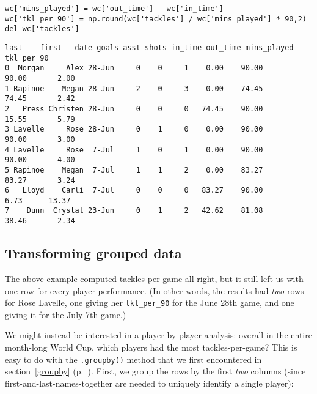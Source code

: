 \begin{Verbatim}[fontsize=\small,samepage=true,frame=single,framesep=3mm]
wc['mins_played'] = wc['out_time'] - wc['in_time']
wc['tkl_per_90'] = np.round(wc['tackles'] / wc['mins_played'] * 90,2)
del wc['tackles']
\end{Verbatim}
\vspace{-.2in}

\begin{Verbatim}[fontsize=\footnotesize,samepage=true,frame=leftline,framesep=5mm,framerule=1mm]
     last    first   date goals asst shots in_time out_time mins_played tkl_per_90
0  Morgan     Alex 28-Jun     0    0     1    0.00    90.00       90.00       2.00
1 Rapinoe    Megan 28-Jun     2    0     3    0.00    74.45       74.45       2.42
2   Press Christen 28-Jun     0    0     0   74.45    90.00       15.55       5.79
3 Lavelle     Rose 28-Jun     0    1     0    0.00    90.00       90.00       3.00
4 Lavelle     Rose  7-Jul     1    0     1    0.00    90.00       90.00       4.00
5 Rapinoe    Megan  7-Jul     1    1     2    0.00    83.27       83.27       3.24
6   Lloyd    Carli  7-Jul     0    0     0   83.27    90.00        6.73      13.37
7    Dunn  Crystal 23-Jun     0    1     2   42.62    81.08       38.46       2.34
\end{Verbatim}

\subsection{Transforming grouped data}

The above example computed tackles-per-game all right, but it still left us
with one row for every player-performance. (In other words, the results had
\textit{two} rows for Rose Lavelle, one giving her \texttt{tkl\_per\_90} for
the June 28th game, and one giving it for the July 7th game.)


We might instead be interested in a player-by-player analysis: overall in the
entire month-long World Cup, which players had the most tackles-per-game? This
is easy to do with the \texttt{.groupby()} method that we first encountered in
section~\ref{groupby} (p.~\pageref{groupby}). First, we group the rows by the
first \textit{two} columns (since first-and-last-names-together are needed to
uniquely identify a single player):


